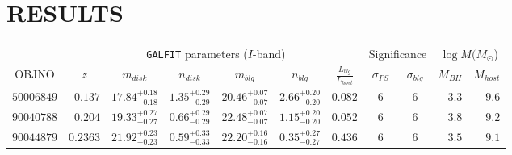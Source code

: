 \documentclass[11pt,twocolumn]{article}
\begin{document}
\section{\normalsize RESULTS}\label{results}
\begin{table}[!t]
\fontsize{9.2}{13}\selectfont


\begin{tabular}{@{}rrrrrrrccrr@{}}
\toprule\toprule
\multicolumn{1}{c}{} &
  \multicolumn{1}{c}{} &
  \multicolumn{4}{c}{{\tt {\tt GALFIT}} parameters ($I$-band) } &
  \multicolumn{1}{c}{} &
  \multicolumn{2}{c}{Significance} &
  \multicolumn{2}{c}{$\log{M} (M_{\odot}$)} \\ 

\cmidrule(r){3-6} \cmidrule(r){8-9} \cmidrule(r){10-11}

  \multicolumn{1}{c}{OBJNO} &
  \multicolumn{1}{c}{$z$} &
  \multicolumn{1}{c}{$m_{disk}$} &
  \multicolumn{1}{c}{$n_{disk}$} &
  \multicolumn{1}{c}{$m_{blg}$} &
  \multicolumn{1}{c}{$n_{blg}$} &
  \multicolumn{1}{c}{$\frac{L_{blg}}{L_{host}}$} &
  \multicolumn{1}{c}{$\sigma_{PS}$} &
  \multicolumn{1}{c}{$\sigma_{blg}$} &
   \multicolumn{1}{c}{$M_{BH}$} &
  \multicolumn{1}{c}{$M_{host}$} \\
 \midrule
\color{red} $50006849$ & \color{red} $0.137$ & \color{red} $17.84^{+0.18}_{-0.18}$ & \color{red} $1.35^{+0.29}_{-0.29}$ & \color{red} $20.46^{+0.07}_{-0.07}$ & \color{red} $2.66^{+0.20}_{-0.20}$ & \color{red} $0.082$ & \color{red} $6$ & \color{red} $6$ & \color{red} $3.3$ & \color{red} $9.6$\\

$90040788$ & $0.204$ & $19.33^{+0.27}_{-0.27}$ & $0.66^{+0.29}_{-0.29}$ & $22.48^{+0.07}_{-0.07}$ & $1.15^{+0.20}_{-0.20}$ & $0.052$ & $6$ & $6$ & $3.8$ & $9.2$\\

$90044879$ & $0.2363$ & $21.92^{+0.23}_{-0.23}$ & $0.59^{+0.33}_{-0.33}$ & $22.20^{+0.16}_{-0.16}$ & $0.35^{+0.27}_{-0.27}$ & $0.436$ & $6$ & $6$ & $3.5$ & $9.1$\\


\end{tabular}
\end{table}
\end{document}
